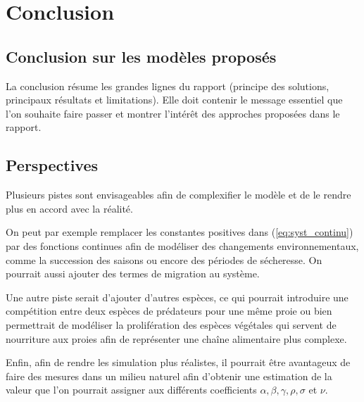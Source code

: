 \chapter{Conclusion}
\label{ch:Conclusion} 

\section{Conclusion sur les modèles proposés}
La conclusion résume les grandes lignes du rapport (principe des solutions, principaux résultats et limitations). Elle doit contenir le message essentiel que l’on souhaite faire passer et montrer l’intérêt des approches proposées dans le rapport.

\section{Perspectives}

Plusieurs pistes sont envisageables afin de complexifier le modèle et de le rendre plus en accord avec la réalité.

On peut par exemple remplacer les constantes positives dans (\ref{eq:syst_continu}) par des fonctions continues afin de modéliser des changements environnementaux, comme la succession des saisons ou encore des périodes de sécheresse. On pourrait aussi ajouter des termes de migration au système.

Une autre piste serait d'ajouter d'autres espèces, ce qui pourrait introduire une compétition entre deux espèces de prédateurs pour une même proie ou bien permettrait de modéliser la prolifération des espèces végétales qui servent de nourriture aux proies afin de représenter une chaîne alimentaire plus complexe.

\vspace{0.3cm}
Enfin, afin de rendre les simulation plus réalistes, il pourrait être avantageux de faire des mesures dans un milieu naturel afin d'obtenir une estimation de la valeur que l'on pourrait assigner aux différents coefficients $\alpha, \beta, \gamma, \rho, \sigma$ et $\nu$.
